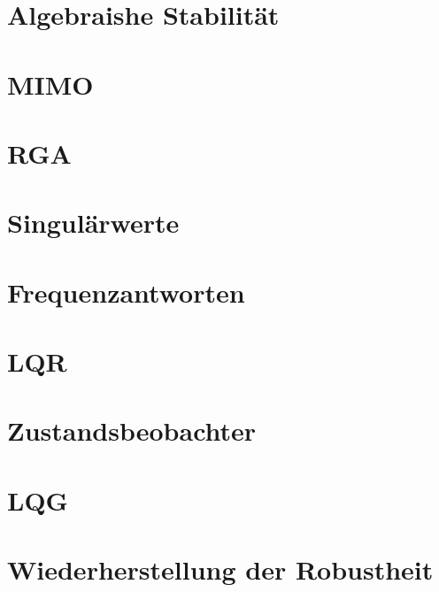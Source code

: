 \begin{multicols*}{3}
\vfill\null\columnbreak
\section{Algebraishe Stabilität}
    
    

\vfill\null\columnbreak 
\section{MIMO}
    
    
    

\vfill\null\columnbreak 
\section{RGA}
    

\vfill\null\columnbreak 
\section{Singulärwerte}
    
  
\vfill\null\columnbreak  
\section{Frequenzantworten}
    
    
    
    
\vfill\null\columnbreak
\section{LQR}
    
    
    
    
    
    
\vfill\null\columnbreak
\section{Zustandsbeobachter}
    
\vfill\null\columnbreak
    
    
\vfill\null\columnbreak
\section{LQG}
    
    
    
    
    
\section{Wiederherstellung der Robustheit}
    
    
\end{multicols*}     



